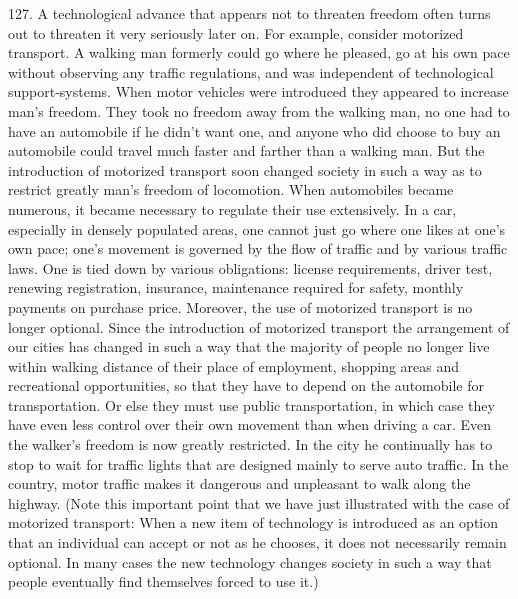 \documentclass{article}
\begin{document}
127. A technological advance that appears not to threaten freedom often turns out to threaten it 
very seriously later on. For example, consider motorized transport. A walking man formerly 
could go where he pleased, go at his own pace without observing any traffic regulations, and was 
independent of technological support-systems. When motor vehicles were introduced they 
appeared to increase man’s freedom. They took no freedom away from the walking man, no one 
had to have an automobile if he didn’t want one, and anyone who did choose to buy an automobile 
could travel much faster and farther than a walking man. But the introduction of motorized 
transport soon changed society in such a way as to restrict greatly man’s freedom of 
locomotion. When automobiles became numerous, it became necessary to regulate their use 
extensively. In a car, especially in densely populated areas, one cannot just go where one likes at 
one’s own pace; one’s movement is governed by the flow of traffic and by various traffic 
laws. One is tied down by various obligations: license requirements, driver test, renewing 
registration, insurance, maintenance required for safety, monthly payments on purchase 
price. Moreover, the use of motorized transport is no longer optional. Since the introduction of 
motorized transport the arrangement of our cities has changed in such a way that the majority of 
people no longer live within walking distance of their place of employment, shopping areas and 
recreational opportunities, so that they have to depend on the automobile for transportation. Or 
else they must use public transportation, in which case they have even less control over their own 
movement than when driving a car. Even the walker’s freedom is now greatly restricted. In the 
city he continually has to stop to wait for traffic lights that are designed mainly to serve auto 
traffic. In the country, motor traffic makes it dangerous and unpleasant to walk along the 
highway. (Note this important point that we have just illustrated with the case of motorized 
transport: When a new item of technology is introduced as an option that an individual can accept 
or not as he chooses, it does not necessarily remain optional. In many cases the new technology 
changes society in such a way that people eventually find themselves forced to use it.) \vspace{\baselineskip}
\end{document}
